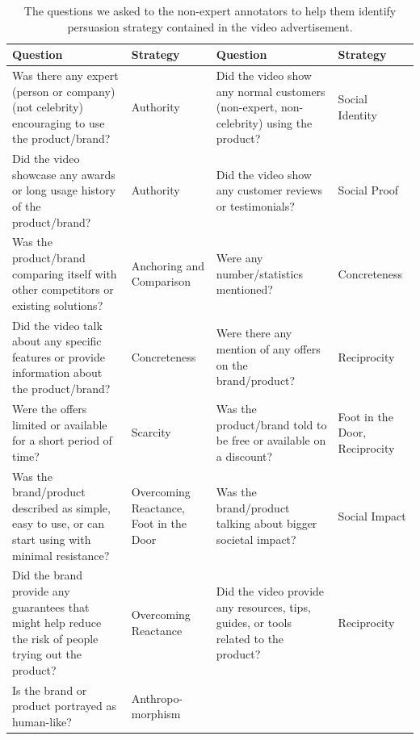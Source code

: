 \begin{table}[!hp]
  \centering
  \begin{tabular}{|p{3.5cm}|p{2.3cm}|p{3.5cm}|p{2.3cm}|}
    \hline
    \textbf{Question} & \textbf{Strategy} & \textbf{Question} & \textbf{Strategy} \\
    \hline
    Was there any expert (person or company) (not celebrity) encouraging to use the product/brand? & Authority & Did the video show any normal customers (non-expert, non-celebrity) using the product? & Social Identity \\
    \hline
    Did the video showcase any awards or long usage history of the product/brand? & Authority & Did the video show any customer reviews or testimonials? & Social Proof \\
    \hline
    Was the product/brand comparing itself with other competitors or existing solutions? & Anchoring and Comparison & Were any number/statistics mentioned? & Concreteness \\
    \hline
    Did the video talk about any specific features or provide information about the product/brand? & Concreteness & Were there any mention of any offers on the brand/product? & Reciprocity \\
    \hline
    Were the offers limited or available for a short period of time? & Scarcity & Was the product/brand told to be free or available on a discount? & Foot in the Door, Reciprocity \\
    \hline
    Was the brand/product described as simple, easy to use, or can start using with minimal resistance? & Overcoming Reactance, Foot in the Door & Was the brand/product talking about bigger societal impact? & Social Impact \\
    \hline
    Did the brand provide any guarantees that might help reduce the risk of people trying out the product? & Overcoming Reactance & Did the video provide any resources, tips, guides, or tools related to the product? & Reciprocity \\
    \hline
    Is the brand or product portrayed as human-like? & \makecell{Anthropo-\\morphism} & & \\
    \hline
  \end{tabular}
  \caption{The questions we asked to the non-expert annotators to help them identify persuasion strategy contained in the video advertisement. \label{table:persuasion strategy questions}}
\end{table}





